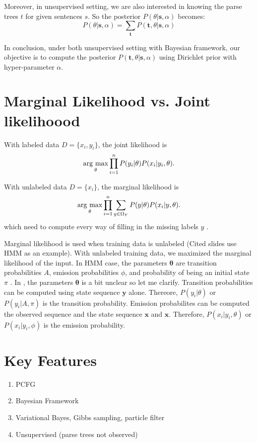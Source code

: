 \documentclass[11pt]{article}
\newcommand{\argmax}{\mathop{\rm arg~max}\limits}
\begin{document}
Moreover, in unsupervised setting, we are also interested in knowing the parse trees $t$ for given sentences $s$. So the posterior $P(\theta|\boldsymbol{s}, \alpha)$ becomes:
$$
P(\theta|\boldsymbol{s}, \alpha) = \sum_{\boldsymbol{t}} P(\boldsymbol{t}, \theta | \boldsymbol{s}, \alpha) 
$$

In conclusion, under both unsupervised setting with Bayesian framework, our objective is to compute the posterior $P(\boldsymbol{t}, \theta | \boldsymbol{s}, \alpha)$ using Dirichlet prior with hyper-parameter $\alpha$.

\section{Marginal Likelihood vs. Joint likelihoood}

With labeled data $D = \{x_i, y_i\}$, the joint likelihood \cite{joint_vs_marginal} is
$$
\argmax_{\theta} \prod^n_{i = 1} P(y_i|\theta) P(x_i|y_i, \theta).
$$

With unlabeled data $D = \{x_i\}$, the marginal likelihood \cite{joint_vs_marginal} is
$$
\argmax_{\theta} \prod^n_{i = 1} \sum_{y \in \Omega_Y}P(y|\theta) P(x_i|y, \theta).
$$
which need to compute every way of filling in the missing labels $y$ \cite{mlss09}.


Marginal likelihood is used when training data is unlabeled \cite{joint_vs_marginal} (Cited slides use HMM as an example). 
With unlabeled training data, we maximized the marginal likelihood of the input. In HMM case, the parameters $\boldsymbol{\theta}$ are transition probabilities $A$, emission probabilities $\phi$, and probability of being an initial state $\pi$ \cite{hmm_parameters}. In \cite{joint_vs_marginal}, the parameters $\boldsymbol{\theta}$ is a bit unclear so let me clarify. Transition probabilities can be computed using state sequence $\boldsymbol{y}$ alone. Thereore, $P(y_i|\theta)$ or $P(y_i|A, \pi)$ is the transition probability. Emission probabilites can be computed the observed sequence and the state sequence $\boldsymbol{x}$ and $\boldsymbol{x}$. Therefore, $P(x_i|y_i,\theta)$ or $P(x_i|y_i, \phi)$ is the emission probability. 

\section{Key Features}
\begin{enumerate}
 \item PCFG
 \item Bayesian Framework
 \item Variational Bayes, Gibbs sampling, particle filter
 \item Unsupervised (parse trees not observed)
\end{enumerate}
\end{document}
